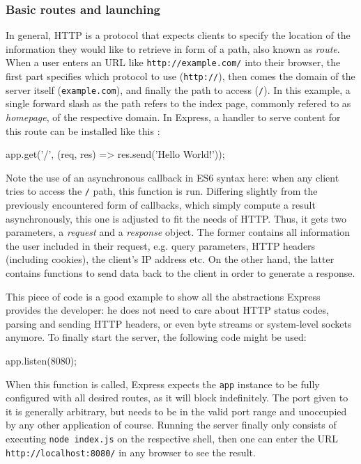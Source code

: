 \documentclass{bioinfo}
\begin{document}
\subsubsection{Basic routes and launching}

In general, HTTP is a protocol that expects clients to specify the location of the information they would like to retrieve in form of a path, also known as \textit{route}. When a user enters an URL like \texttt{http://example.com/} into their browser, the first part specifies which protocol to use (\texttt{http://}), then comes the domain of the server itself (\texttt{example.com}), and finally the path to access (\texttt{/}). In this example, a single forward slash as the path refers to the index page, commonly refered to as \textit{homepage}, of the respective domain. In Express, a handler to serve content for this route can be installed like this \cite{expresshelloworld}:

\begin{verbatim*}
    app.get('/', (req, res) =>
        res.send('Hello World!'));
\end{verbatim*}

Note the use of an asynchronous callback in ES6 syntax here: when any client tries to access the \texttt{/} path, this function is run. Differing slightly from the previously encountered form of callbacks, which simply compute a result asynchronously, this one is adjusted to fit the needs of HTTP. Thus, it gets two parameters, a \textit{request} and a \textit{response} object. The former contains all information the user included in their request, e.g. query parameters, HTTP headers (including cookies), the client's IP address etc. On the other hand, the latter contains functions to send data back to the client in order to generate a response.

This piece of code is a good example to show all the abstractions Express provides the developer: he does not need to care about HTTP status codes, parsing and sending HTTP headers, or even byte streams or system-level sockets anymore. To finally start the server, the following code might be used:

\begin{verbatim*}
    app.listen(8080);
\end{verbatim*}

When this function is called, Express expects the \texttt{app} instance to be fully configured with all desired routes, as it will block indefinitely. The port given to it is generally arbitrary, but needs to be in the valid port range and unoccupied by any other application of course. Running the server finally only consists of executing \texttt{node index.js} on the respective shell, then one can enter the URL \texttt{http://localhost:8080/} in any browser to see the result.
\end{document}
